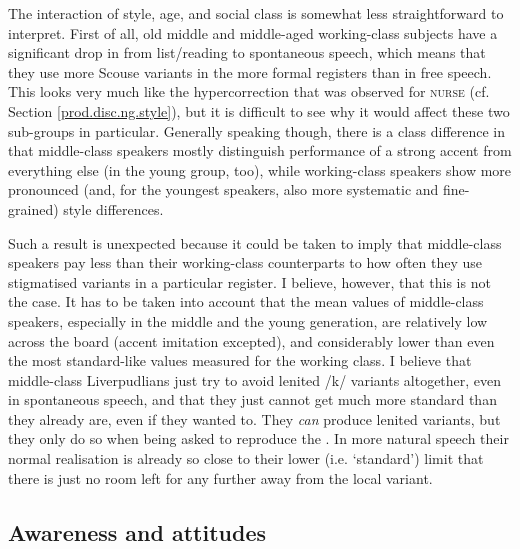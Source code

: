 The interaction of style, age, and social class is somewhat less straightforward to interpret.
First of all, old middle and middle-aged working-class subjects have a significant drop in  from list/reading to spontaneous speech, which means that they use more Scouse variants in the more formal registers than in free speech.
This looks very much like the hypercorrection that was observed for \textsc{nurse} (cf. Section \ref{prod.disc.ng.style}), but it is difficult to see why it would affect these two sub-groups in particular.
Generally speaking though, there is a class difference in that middle-class speakers mostly distinguish performance of a strong accent from everything else (in the young group, too), while working-class speakers show more pronounced (and, for the youngest speakers, also more systematic and fine-grained) style differences.

Such a result is unexpected because it could be taken to imply that middle-class speakers pay less  than their working-class counterparts to how often they use stigmatised variants in a particular register.
I believe, however, that this is not the case.
It has to be taken into account that the mean  values of middle-class speakers, especially in the middle and the young generation, are relatively low across the board (accent imitation excepted), and considerably lower than even the most standard-like values measured for the working class.
I believe that middle-class Liverpudlians just try to avoid lenited /k/ variants altogether, even in spontaneous speech, and that they just cannot get much more standard than they already are, even if they wanted to.
They \emph{can} produce lenited variants, but they only do so when being asked to reproduce the .
In more natural speech their normal realisation is already so close to their lower (i.e. `standard') limit that there is just no room left for any further  away from the local variant.

\subsection{Awareness and attitudes}
\label{prod.disc.k.aware}

